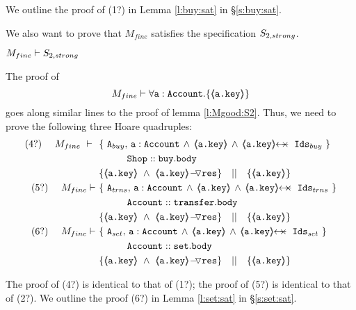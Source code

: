 \begin{proofO}


We outline the proof of (1?) in Lemma \ref{l:buy:sat} in \S \ref{s:buy:sat}.

\end{proofO}

We also want to prove that $M_{fine}$ satisfies the specification $S_{2,strong}$.

\begin{lemma}
\label{l:Mfine:S2}
$M_{fine} \vdash S_{2,strong}$
\end{lemma}
\begin{proofO}
The proof of
$$M_{fine} \vdash \forall {\mbox{\normalfont{\texttt{a}}}:\mbox{\normalfont{\texttt{Account}}}}.{{\{}}{\langle\!\!\langle \mbox{\normalfont{\texttt{\mbox{\normalfont{\texttt{a.key}}}}}} \rangle\!\!\rangle}{{\}}}$$
goes along similar lines to the proof of lemma \ref{l:Mgood:S2}.
Thus, we need to prove the following  three Hoare quadruples: 
 \small
\begin{align*}
\text{(4?)}  \ \ \ \ M_{fine}\ \vdash  \  \ 
		&	\{  \ \Alocals, \, \prg{a}:\prg{Account} \, \wedge\, {\inside{\prg{a.key}}} \, \wedge \, \protectedFrom {\prg{a.key}} {\Ids}  \  \} \\
		& \SPT \prg{Shop}::\prg{buy}.\prg{body}\ \\  
		& \{ {\inside{\prg{a.key}}}\ \wedge\ {\PushASLong {\prg{res}} {\inside{\prg{a.key}}}}  \} \ \ \  || \ \ \ 
		   \{ {\inside{\prg{a.key}}} \}
\\
\text{(5?)}  \ \ \ \ M_{fine} \vdash \ 
		&	\{  \ \Alocalstr, \, \prg{a}:\prg{Account}\, \wedge\,  {\inside{\prg{a.key}}} \, \wedge \, \protectedFrom {\prg{a.key}} {\Idstr}  \  \} \\
		& \SPT \prg{Account}::\prg{transfer}.\prg{body}\ \\  
		& \{ {\inside{\prg{a.key}}}\ \wedge\ {\PushASLong {\prg{res}} {\inside{\prg{a.key}}}}  \} \ \ \  || \ \ \ 
		   \{ {\inside{\prg{a.key}}} \}
\\
\text{(6?)}  \ \ \ \ M_{fine} \vdash \ 
		&	\{  \ \Alocalsset, \, \prg{a}:\prg{Account}\, \wedge\,  {\inside{\prg{a.key}}} \, \wedge \, \protectedFrom {\prg{a.key}} {\Idsset}  \  \} \\
		& \SPT \prg{Account}::\prg{set}.\prg{body}\ \\  
		& \{ {\inside{\prg{a.key}}}\ \wedge\ {\PushASLong {\prg{res}} {\inside{\prg{a.key}}}}  \} \ \ \  || \ \ \ 
		   \{ {\inside{\prg{a.key}}} \}
\end{align*}

 
\normalsize

The proof of (4?) is identical to that of (1?); the proof of (5?) is identical to that of (2?). 
We outline the proof (6?)    in Lemma \ref{l:set:sat} in \S \ref{s:set:sat}.

\end{proofO}



